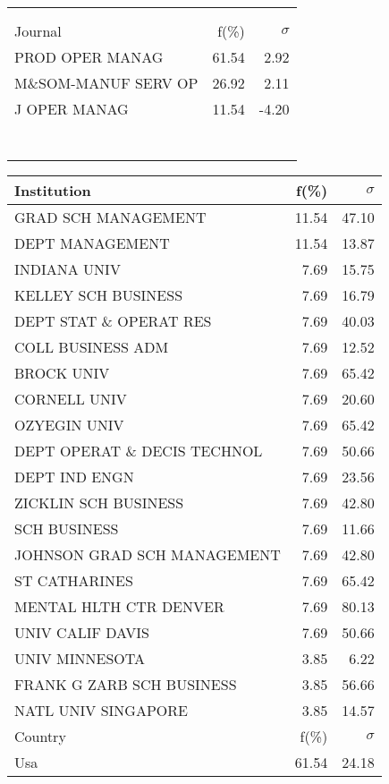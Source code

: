 \documentclass[a4paper,11pt]{report}
\begin{document}
\begin{landscape}
\begin{table}[!ht]
{\begin{tabular}{|l r  r|}
 &  & \\
 &  & \\
\hline
\hline
Journal & f(\%) & $\sigma$\\
\hline
PROD OPER MANAG & 61.54 & 2.92\\
M\&SOM-MANUF SERV OP & 26.92 & 2.11\\
J OPER MANAG & 11.54 & -4.20\\
 &  & \\
 &  & \\
 &  & \\
 &  & \\
 &  & \\
 &  & \\
 &  & \\
\hline
\end{tabular}
}
{\scriptsize\begin{tabular}{|l r r|}
\hline
Institution & f(\%) & $\sigma$\\
\hline
GRAD SCH MANAGEMENT & 11.54 & 47.10\\
DEPT MANAGEMENT & 11.54 & 13.87\\
INDIANA UNIV & 7.69 & 15.75\\
KELLEY SCH BUSINESS & 7.69 & 16.79\\
DEPT STAT \& OPERAT RES & 7.69 & 40.03\\
COLL BUSINESS ADM & 7.69 & 12.52\\
BROCK UNIV & 7.69 & 65.42\\
CORNELL UNIV & 7.69 & 20.60\\
OZYEGIN UNIV & 7.69 & 65.42\\
DEPT OPERAT \& DECIS TECHNOL & 7.69 & 50.66\\
DEPT IND ENGN & 7.69 & 23.56\\
ZICKLIN SCH BUSINESS & 7.69 & 42.80\\
SCH BUSINESS & 7.69 & 11.66\\
JOHNSON GRAD SCH MANAGEMENT & 7.69 & 42.80\\
ST CATHARINES & 7.69 & 65.42\\
MENTAL HLTH CTR DENVER & 7.69 & 80.13\\
UNIV CALIF DAVIS & 7.69 & 50.66\\
UNIV MINNESOTA & 3.85 & 6.22\\
FRANK G ZARB SCH BUSINESS & 3.85 & 56.66\\
NATL UNIV SINGAPORE & 3.85 & 14.57\\
\hline
\hline
Country & f(\%) & $\sigma$\\
\hline
Usa & 61.54 & 24.18\\

\end{tabular}}
\end{table}
\end{landscape}
\end{document}
